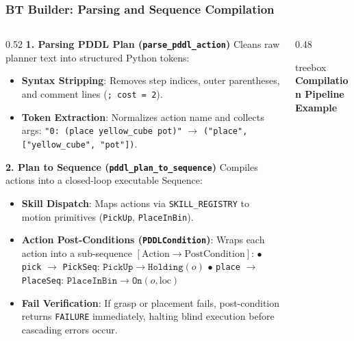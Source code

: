 \documentclass[10pt]{beamer}
\begin{document}
\begin{frame}[fragile]
\frametitle{BT Builder: Parsing and Sequence Compilation}
\begin{columns}[T]
    \begin{column}{0.52\textwidth}
        \small \textbf{1. Parsing PDDL Plan (\texttt{parse\_pddl\_action})}
        \scriptsize
        Cleans raw planner text into structured Python tokens:
        \begin{itemize}\setlength\itemsep{0.03em}
            \item \textbf{Syntax Stripping}: Removes step indices, outer parentheses, and comment lines (\texttt{; cost = 2}).
            \item \textbf{Token Extraction}: Normalizes action name and collects args:
            \newline \tiny \texttt{"0: (place yellow\_cube pot)"} $\to$ \texttt{("place", ["yellow\_cube", "pot"])}.
        \end{itemize}

        \vspace{0.08cm}
        \small \textbf{2. Plan to Sequence (\texttt{pddl\_plan\_to\_sequence})}
        \scriptsize
        Compiles actions into a closed-loop executable Sequence:
        \begin{itemize}\setlength\itemsep{0.03em}
            \item \textbf{Skill Dispatch}: Maps actions via \texttt{SKILL\_REGISTRY} to motion primitives (\texttt{PickUp}, \texttt{PlaceInBin}).
            \item \textbf{Action Post-Conditions (\texttt{PDDLCondition})}: Wraps each action into a sub-sequence $[ \text{Action} \to \text{PostCondition} ]$:
            \newline $\bullet$ \texttt{pick} $\to$ \texttt{PickSeq}: $\texttt{PickUp} \to \texttt{Holding}(o)$
            \newline $\bullet$ \texttt{place} $\to$ \texttt{PlaceSeq}: $\texttt{PlaceInBin} \to \texttt{On}(o, \text{loc})$
            \item \textbf{Fail Verification}: If grasp or placement fails, post-condition returns \texttt{FAILURE} immediately, halting blind execution before cascading errors occur.
        \end{itemize}
    \end{column}

    \begin{column}{0.48\textwidth}
        \begin{beamercolorbox}[sep=4.5pt,rounded=true,shadow=true]{treebox}
            \scriptsize \textbf{Compilation Pipeline Example}
            \vspace{0.06cm}


\end{beamercolorbox}
\end{column}
\end{columns}
\end{frame}
\end{document}
